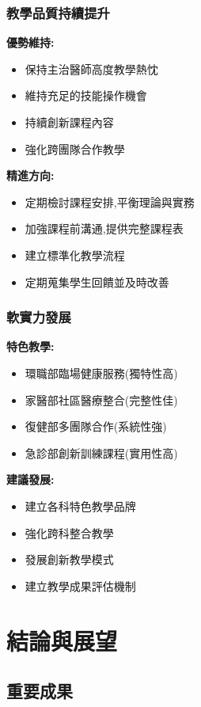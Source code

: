 \documentclass[12pt,a4paper]{article}
\begin{document}
\subsubsection{教學品質持續提升}

\textbf{優勢維持:}
\begin{itemize}[leftmargin=*]
\item 保持主治醫師高度教學熱忱
\item 維持充足的技能操作機會
\item 持續創新課程內容
\item 強化跨團隊合作教學
\end{itemize}

\textbf{精進方向:}
\begin{itemize}[leftmargin=*]
\item 定期檢討課程安排,平衡理論與實務
\item 加強課程前溝通,提供完整課程表
\item 建立標準化教學流程
\item 定期蒐集學生回饋並及時改善
\end{itemize}

\subsubsection{軟實力發展}

\textbf{特色教學:}
\begin{itemize}[leftmargin=*]
\item 環職部臨場健康服務(獨特性高)
\item 家醫部社區醫療整合(完整性佳)
\item 復健部多團隊合作(系統性強)
\item 急診部創新訓練課程(實用性高)
\end{itemize}

\textbf{建議發展:}
\begin{itemize}[leftmargin=*]
\item 建立各科特色教學品牌
\item 強化跨科整合教學
\item 發展創新教學模式
\item 建立教學成果評估機制
\end{itemize}

\newpage
\section{結論與展望}

\subsection{重要成果}
\end{document}
